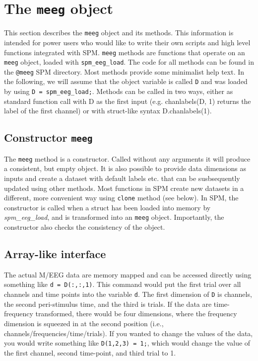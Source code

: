 \section{The \texttt{meeg} object}
This section describes the \texttt{meeg} object and its methods. This information is intended for power users who would like to write their own scripts and high level functions integrated with SPM. \texttt{meeg} methods are functions that operate on an \texttt{meeg} object, loaded with \texttt{spm\_eeg\_load}. The code for all methods can be found in the \texttt{@meeg} SPM directory. Most methods provide some minimalist help text. In the following, we will assume that the object variable is called \texttt{D} and was  loaded by using \texttt{D = spm\_eeg\_load;}. Methods can be called in two ways, either as standard function call with D as the first input (e.g. chanlabels(D, 1) returns the label of the first channel) or with struct-like syntax D.chanlabels(1). 

\subsection{Constructor \texttt{meeg}}
The \texttt{meeg} method is a constructor. Called without any arguments it will produce a consistent, but empty object. It is also possible to provide data dimensions as inputs and create a dataset with default labels etc. that can be susbsequently updated using other methods. Most functions in SPM create new datasets in a different, more convenient way using \texttt{clone} method (see below).  In SPM, the constructor is called when a struct has been loaded into memory by \textit{spm\_eeg\_load}, and is transformed into an \texttt{meeg} object. Importantly, the constructor also checks the consistency of the object. 

\subsection{Array-like interface}
The actual M/EEG data are memory mapped and can be accessed directly using something like \texttt{d = D(:,:,1)}. This command would put the first trial over all channels and time points into the variable \texttt{d}. The first dimension of \texttt{D} is channels, the second peri-stimulus time, and the third is trials. If the data are time-frequency transformed, there would be four dimensions, where the frequency dimension is squeezed in at the second position (i.e., channels/frequencies/time/trials). If you wanted to change the values of the data, you would write something like \texttt{D(1,2,3) = 1;}, which would change the value of the first channel, second time-point, and third trial to 1.

